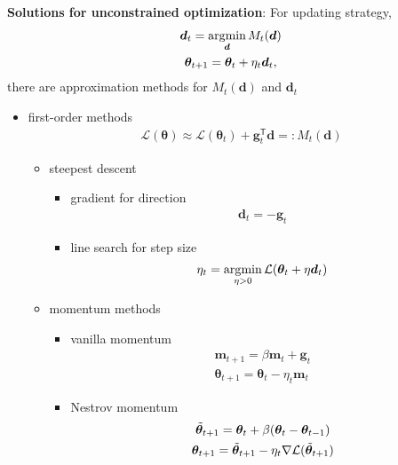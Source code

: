 \textbf{Solutions for unconstrained optimization}: For updating strategy, 
\begin{gather}
    \bm{d}_t=\operatorname*{\arg\!min}_{\bm{d}}M_t(\bm{d})\\
    \bm{\theta}_{t+1} = \bm{\theta}_t+\eta_t\bm{d}_t,
\end{gather}
there are approximation methods for $M_t(\bm{d})$ and $\bm{d}_t$
\begin{itemize}
    \item first-order methods 
    \begin{gather}
        \mathcal{L}(\bm{\theta})\approx\mathcal{L}(\bm{\theta}_t)+\bm{g}_t^\mathsf{T}\bm{d}=:M_t(\bm{d})
    \end{gather}
    \begin{itemize}
        \item steepest descent
        \begin{itemize}
            \item gradient for direction 
            \begin{gather}
                \bm{d}_t = -\bm{g}_t
            \end{gather}
            \item line search for step size 
            \begin{gather}
                \eta_t = \operatorname*{\arg\!min}_{\eta>0}\mathcal{L}(\bm{\theta}_t+\eta\bm{d}_t)
            \end{gather}
        \end{itemize}
        \item momentum methods
        \begin{itemize}
            \item vanilla momentum 
            \begin{gather}
                \bm{m}_{t+1} = \beta\bm{m}_t+\bm{g}_t \\
                \bm{\theta}_{t+1} = \bm{\theta}_t-\eta_t\bm{m}_t 
            \end{gather}
            \item Nestrov momentum 
            \begin{gather}
                \Tilde{\bm{\theta}}_{t+1} = \bm{\theta}_t+\beta(\bm{\theta}_t-\bm{\theta}_{t-1})\\
                \bm{\theta}_{t+1} = \Tilde{\bm{\theta}}_{t+1}-\eta_t\nabla\mathcal{L}(\Tilde{\bm{\theta}}_{t+1})

\end{gather}
\end{itemize}
\end{itemize}
\end{itemize}
